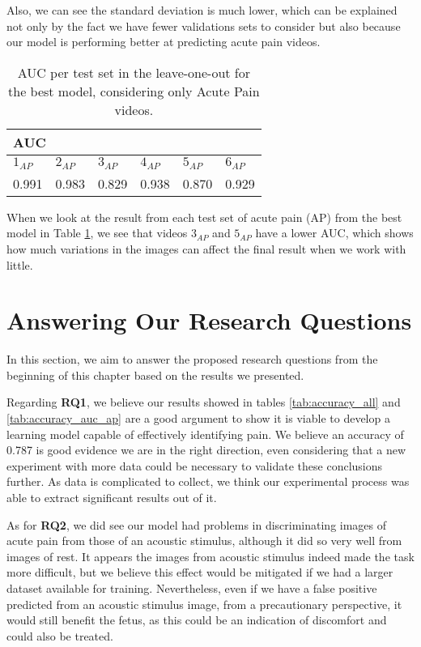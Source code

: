 Also, we can see the standard deviation is much lower, which can be explained not only by the fact we have fewer validations sets to consider but also because our model is performing better at predicting acute pain videos.

\begin{table}[h!tp]
\setlength{\tabcolsep}{3.41pt}
\centering
\caption{AUC per test set in the leave-one-out for the best model, considering only Acute Pain videos.}
\label{tab:auc_leave_one_out}
\begin{tabular}{llllll}
\hline
\multicolumn{6}{l}{AUC} \\ \hline
\multicolumn{1}{l|}{$1_{AP}$}    & \multicolumn{1}{l|}{$2_{AP}$}    & \multicolumn{1}{l|}{$3_{AP}$}    & \multicolumn{1}{l|}{$4_{AP}$}    & \multicolumn{1}{l|}{$5_{AP}$}    & $6_{AP}$   \\ \hline
\multicolumn{1}{l|}{0.991} & \multicolumn{1}{l|}{0.983} & \multicolumn{1}{l|}{0.829} & \multicolumn{1}{l|}{0.938} & \multicolumn{1}{l|}{0.870} & 0.929 \\ \hline
\end{tabular}
\end{table}

When we look at the result from each test set of acute pain (AP) from the best model in Table \ref{tab:auc_leave_one_out}, we see that videos $3_{AP}$ and $5_{AP}$ have a lower AUC, which shows how much variations in the images can affect the final result when we work with little.

\section{Answering Our Research Questions}

In this section, we aim to answer the proposed research questions from the beginning of this chapter based on the results we presented.

Regarding \textbf{RQ1}, we believe our results showed in tables \ref{tab:accuracy_all} and \ref{tab:accuracy_auc_ap} are a good argument to show it is viable to develop a learning model capable of effectively identifying pain. We believe an accuracy of 0.787 is good evidence we are in the right direction, even considering that a new experiment with more data could be necessary to validate these conclusions further. As data is complicated to collect, we think our experimental process was able to extract significant results out of it.

As for \textbf{RQ2}, we did see our model had problems in discriminating images of acute pain from those of an acoustic stimulus, although it did so very well from images of rest. It appears the images from acoustic stimulus indeed made the task more difficult, but we believe this effect would be mitigated if we had a larger dataset available for training. Nevertheless, even if we have a false positive predicted from an acoustic stimulus image, from a precautionary perspective, it would still benefit the fetus, as this could be an indication of discomfort and could also be treated.

